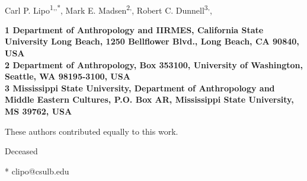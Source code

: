 \documentclass[10pt,letterpaper]{article}
\date{}
\begin{document}
\vspace*{0.35in}

\begin{flushleft}
{\Large
\textbf{}
}
\newline
\\
Carl P. Lipo\textsuperscript{1,\Yinyang,*},
Mark E. Madsen\textsuperscript{2,\Yinyang},
Robert C. Dunnell\textsuperscript{3,\dag},

\bf{1} Department of Anthropology and IIRMES, California State University Long Beach, 1250 Bellflower Blvd., Long Beach, CA 90840, USA
\\
\bf{2} Department of Anthropology, Box 353100, University of Washington, Seattle, WA 98195-3100, USA
\\
\bf{3} Mississippi State University, Department of Anthropology and Middle Eastern Cultures, P.O. Box AR, Mississippi State University, MS 39762, USA
\\
\bigskip

% 
%
\Yinyang These authors contributed equally to this work.


\dag Deceased


* clipo@csulb.edu

\end{flushleft}
\end{document}
